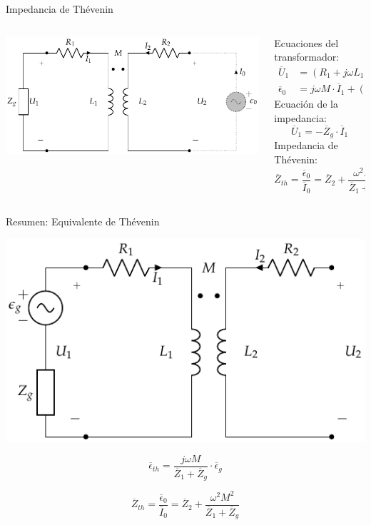 \documentclass[aspectratio=169, usenames,svgnames,dvipsnames]{beamer}
\begin{document}
\begin{frame}[label={sec:orgb4d9073}]{Impedancia de Thévenin}
\begin{columns}
\begin{column}{0.4\columnwidth}
\begin{center}
\includegraphics[width=.9\linewidth]{../figs/Trafo_Real_ImpedanciaPrimario.pdf}
\end{center}
\end{column}
\begin{column}{0.6\columnwidth}
Ecuaciones del transformador:
\begin{align*}
  \overline{U}_1 &= (R_1 + j \omega L_1) \cdot \overline{I}_1 + j \omega M \cdot\overline{I}_0\\
  \overline{\epsilon}_0 &= j \omega M \cdot \overline{I}_1 + (R_2 + j \omega L_2) \cdot \overline{I}_0
\end{align*}
Ecuación de la impedancia:
\[
  \overline{U}_1 = - \overline{Z}_g \cdot \overline{I}_1
\]
Impedancia de Thévenin:
\[
  \boxed{\overline{Z}_{th} = \frac{\overline{\epsilon}_0}{\overline{I}_0} = \overline{Z}_2 + \frac{\omega^2 M^2}{\overline{Z}_1 + \overline{Z}_g}}
\]
\end{column}
\end{columns}
\end{frame}
\begin{frame}[label={sec:org9378396}]{Resumen: Equivalente de Thévenin}
\begin{center}
\includegraphics[height=0.45\textheight]{../figs/Trafo_Real_FuentePrimario.pdf}
\end{center}

\[
  \boxed{\overline{\epsilon}_{th} = \frac{j\omega M}{\overline{Z}_1 + \overline{Z}_g} \cdot \overline{\epsilon}_g}
\]

\[
  \boxed{\overline{Z}_{th} = \frac{\overline{\epsilon}_0}{\overline{I}_0} = \overline{Z}_2 + \frac{\omega^2 M^2}{\overline{Z}_1 + \overline{Z}_g}}
\]
\end{frame}
\end{document}
